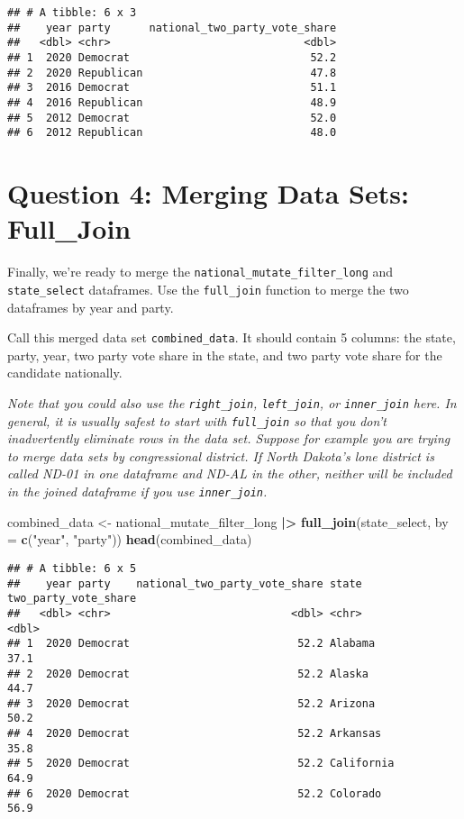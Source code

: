 \documentclass[
]{article}
\newenvironment{Shaded}{\begin{snugshade}}{\end{snugshade}}
\newcommand{\AttributeTok}[1]{\textcolor[rgb]{0.13,0.29,0.53}{#1}}
\newcommand{\FunctionTok}[1]{\textcolor[rgb]{0.13,0.29,0.53}{\textbf{#1}}}
\newcommand{\NormalTok}[1]{#1}
\newcommand{\OtherTok}[1]{\textcolor[rgb]{0.56,0.35,0.01}{#1}}
\newcommand{\SpecialCharTok}[1]{\textcolor[rgb]{0.81,0.36,0.00}{\textbf{#1}}}
\newcommand{\StringTok}[1]{\textcolor[rgb]{0.31,0.60,0.02}{#1}}
\begin{document}
\begin{verbatim}
## # A tibble: 6 x 3
##    year party      national_two_party_vote_share
##   <dbl> <chr>                              <dbl>
## 1  2020 Democrat                            52.2
## 2  2020 Republican                          47.8
## 3  2016 Democrat                            51.1
## 4  2016 Republican                          48.9
## 5  2012 Democrat                            52.0
## 6  2012 Republican                          48.0
\end{verbatim}

\section{Question 4: Merging Data Sets:
Full\_Join}\label{question-4-merging-data-sets-full_join}

Finally, we're ready to merge the
\texttt{national\_mutate\_filter\_long} and \texttt{state\_select}
dataframes. Use the \texttt{full\_join} function to merge the two
dataframes by year and party.

Call this merged data set \texttt{combined\_data}. It should contain 5
columns: the state, party, year, two party vote share in the state, and
two party vote share for the candidate nationally.

\emph{Note that you could also use the \texttt{right\_join},
\texttt{left\_join}, or \texttt{inner\_join} here. In general, it is
usually safest to start with \texttt{full\_join} so that you don't
inadvertently eliminate rows in the data set. Suppose for example you
are trying to merge data sets by congressional district. If North
Dakota's lone district is called ND-01 in one dataframe and ND-AL in the
other, neither will be included in the joined dataframe if you use
\texttt{inner\_join}.}

\begin{Shaded}
\begin{Highlighting}[]
\NormalTok{combined\_data }\OtherTok{\textless{}{-}}\NormalTok{ national\_mutate\_filter\_long }\SpecialCharTok{|\textgreater{}}
  \FunctionTok{full\_join}\NormalTok{(state\_select, }\AttributeTok{by =} \FunctionTok{c}\NormalTok{(}\StringTok{"year"}\NormalTok{, }\StringTok{"party"}\NormalTok{))}
\FunctionTok{head}\NormalTok{(combined\_data)}
\end{Highlighting}
\end{Shaded}

\begin{verbatim}
## # A tibble: 6 x 5
##    year party    national_two_party_vote_share state      two_party_vote_share
##   <dbl> <chr>                            <dbl> <chr>                     <dbl>
## 1  2020 Democrat                          52.2 Alabama                    37.1
## 2  2020 Democrat                          52.2 Alaska                     44.7
## 3  2020 Democrat                          52.2 Arizona                    50.2
## 4  2020 Democrat                          52.2 Arkansas                   35.8
## 5  2020 Democrat                          52.2 California                 64.9
## 6  2020 Democrat                          52.2 Colorado                   56.9
\end{verbatim}
\end{document}
